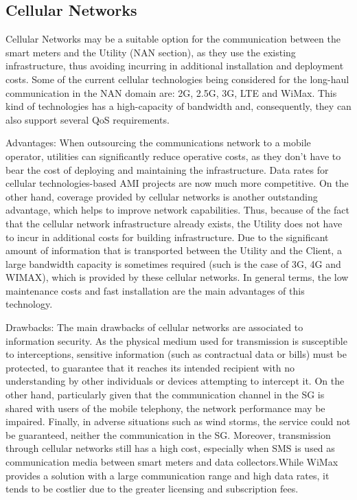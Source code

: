 \documentclass[11pt,draftclsnofoot,onecolumn]{IEEEtran}
\begin{document}
\subsection{Cellular Networks}\label{cellular}
Cellular Networks may be a suitable option for the communication between the smart meters and the Utility (NAN section), as they use the existing infrastructure, thus avoiding incurring in additional installation and deployment costs. Some of the current cellular technologies being considered for the long-haul communication in the NAN domain are: 2G, 2.5G, 3G, LTE and WiMax. This kind of technologies has a high-capacity of bandwidth and, consequently, they can also support several QoS requirements.

Advantages: When outsourcing the communications network to a mobile operator, utilities can significantly reduce operative costs, as they don’t have to bear the cost of deploying and maintaining the infrastructure. Data rates for cellular technologies-based AMI projects are now much more competitive. On the other hand, coverage provided by cellular networks is another outstanding advantage, which helps to improve network capabilities. Thus, because of the fact that the cellular network infrastructure already exists, the Utility does not have to incur in additional costs for building infrastructure. Due to the significant amount of information that is transported between the Utility and the Client, a large bandwidth capacity is sometimes required (such is the case of 3G, 4G and WIMAX), which is provided by these cellular networks. In general terms, the low maintenance costs and fast installation are the main advantages of this technology. 

Drawbacks: The main drawbacks of cellular networks are associated to information security. As the physical medium used for transmission is susceptible to interceptions, sensitive information (such as contractual data or bills) must be protected, to guarantee that it reaches its intended recipient with no understanding by other individuals or devices attempting to intercept it. On the other hand, particularly given that the communication channel in the SG is shared with users of the mobile telephony, the network performance may be impaired. Finally, in adverse situations such as wind storms, the service could not be guaranteed, neither the communication in the SG. Moreover, transmission through cellular networks still has a high cost, especially when SMS is used as communication media between smart meters and data collectors.While WiMax provides a solution with a large communication range and high data rates, it tends to be costlier due to the greater licensing and subscription fees. 
\end{document}
